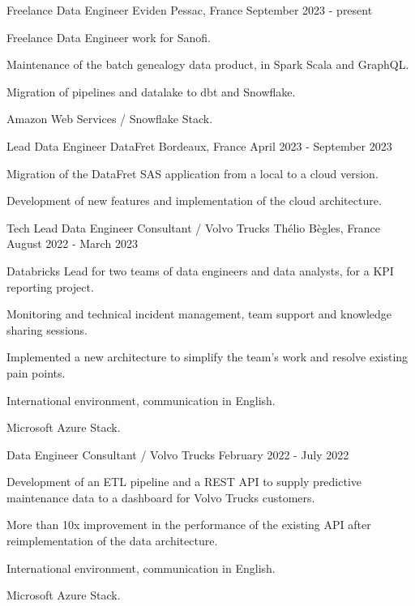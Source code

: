 
\begin{cventries}
	\cventry
	{Freelance Data Engineer}
	{Eviden}
	{Pessac, France}
	{September 2023 - present}
	{
		\begin{cvitems}
			\item {Freelance Data Engineer work for Sanofi.}
			\item {Maintenance of the batch genealogy data product, in Spark Scala and GraphQL.}
			\item {Migration of pipelines and datalake to dbt and Snowflake.}
			\item {Amazon Web Services / Snowflake Stack.}
		\end{cvitems}
	}

	\cventry
	{Lead Data Engineer}
	{DataFret}
	{Bordeaux, France}
	{April 2023 - September 2023}
	{
		\begin{cvitems}
			\item {Migration of the DataFret SAS application from a local to a cloud version.}
			\item {Development of new features and implementation of the cloud architecture.}
		\end{cvitems}
	}
	
	\cventry
	{Tech Lead Data Engineer Consultant / Volvo Trucks}
	{Thélio}
	{Bègles, France}
	{August 2022 - March 2023}
	{
		\begin{cvitems}
			\item Databricks Lead for two teams of data engineers and data analysts, for a KPI reporting project.
			\item Monitoring and technical incident management, team support and knowledge sharing sessions.
			\item Implemented a new architecture to simplify the team's work and resolve existing pain points.
			\item International environment, communication in English.
			\item Microsoft Azure Stack.
		\end{cvitems}
	}
	
	\cventry
	{Data Engineer Consultant / Volvo Trucks}{}{}
	{February 2022 - July 2022}
	{
		\begin{cvitems}
			\item Development of an ETL pipeline and a REST API to supply predictive maintenance data to a dashboard for Volvo Trucks customers.
			\item More than 10x improvement in the performance of the existing API after reimplementation of the data architecture.
			\item International environment, communication in English.
			\item Microsoft Azure Stack.
		\end{cvitems}
	}
	

\end{cventries}
